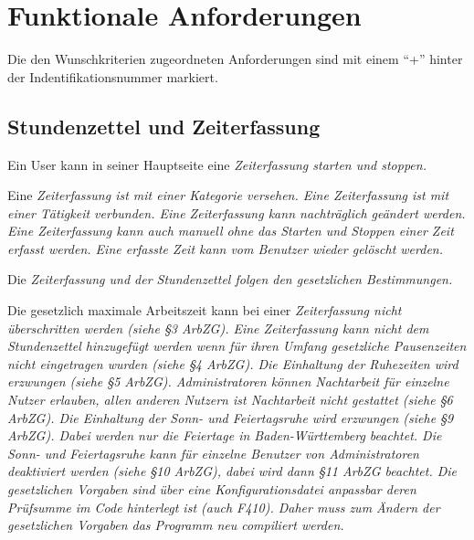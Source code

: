\section{Funktionale Anforderungen}

Die den Wunschkriterien zugeordneten Anforderungen sind mit einem "`+"' hinter der Indentifikationsnummer markiert.

\subsection{Stundenzettel und Zeiterfassung}

\begin{requirements}
    Ein User kann in seiner Hauptseite eine \em{Zeiterfassung} starten und stoppen.
    \begin{requirements}
         Eine \em{Zeiterfassung} ist mit einer \em{Kategorie} versehen.
         Eine \em{Zeiterfassung} ist mit einer \em{Tätigkeit} verbunden.
         Eine \em{Zeiterfassung} kann nachträglich geändert werden.
         Eine \em{Zeiterfassung} kann auch manuell ohne das Starten und Stoppen einer Zeit erfasst werden.
         Eine erfasste Zeit kann vom \em{Benutzer} wieder gelöscht werden.
    \end{requirements}

    Die \em{Zeiterfassung} und der \em{Stundenzettel} folgen den gesetzlichen Bestimmungen.
    \begin{requirements}
         Die gesetzlich maximale Arbeitszeit kann bei einer \em{Zeiterfassung} nicht überschritten werden \em{(siehe §3 ArbZG)}.
         Eine \em{Zeiterfassung} kann nicht dem \em{Stundenzettel} hinzugefügt werden wenn für ihren Umfang gesetzliche Pausenzeiten nicht eingetragen wurden (siehe §4 ArbZG).
         Die Einhaltung der Ruhezeiten wird erzwungen (siehe §5 ArbZG).
         \em{Administratoren} können Nachtarbeit für einzelne Nutzer erlauben, allen anderen Nutzern ist Nachtarbeit nicht gestattet (siehe §6 ArbZG).
         Die Einhaltung der Sonn- und Feiertagsruhe wird erzwungen (siehe §9 ArbZG).
		Dabei werden nur die Feiertage in Baden-Württemberg beachtet.
                Die Sonn- und Feiertagsruhe kann für einzelne \em{Benutzer} von \em{Administratoren} deaktiviert werden (siehe §10 ArbZG), dabei wird dann §11 ArbZG beachtet.
         Die gesetzlichen Vorgaben sind über eine Konfigurationsdatei anpassbar deren Prüfsumme im Code hinterlegt ist \em{(auch F410)}.
                Daher muss zum Ändern der gesetzlichen Vorgaben das Programm neu compiliert werden.
    \end{requirements}


\end{requirements}
